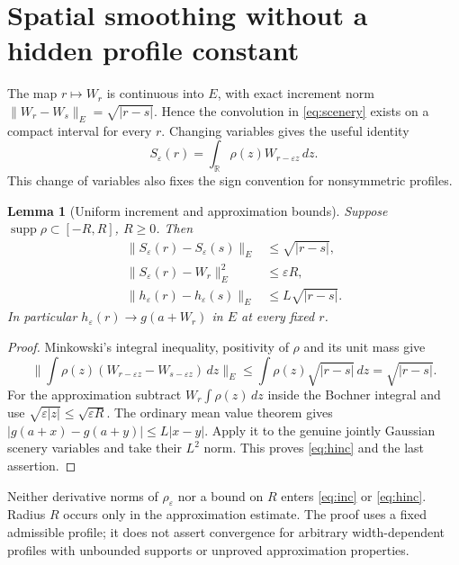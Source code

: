\documentclass[11pt]{article}
\newtheorem{lemma}[theorem]{Lemma}
\newcommand{\R}{\mathbb R}
\begin{document}
\section{Spatial smoothing without a hidden profile constant}
The map $r\mapsto W_r$ is continuous into $E$, with exact increment
norm $\|W_r-W_s\|_E=\sqrt{|r-s|}$. Hence the convolution in
\eqref{eq:scenery} exists on a compact interval for every $r$.
Changing variables gives the useful identity
\[
 S_\varepsilon(r)=\int_\R\rho(z)W_{r-\varepsilon z}\,dz.
\]
This change of variables also fixes the sign convention for nonsymmetric
profiles.

\begin{lemma}[Uniform increment and approximation bounds]\label{lem:spatial}
Suppose $\operatorname{supp}\rho\subset[-R,R]$, $R\geq0$. Then
\begin{align}
 \|S_\varepsilon(r)-S_\varepsilon(s)\|_E
      &\leq\sqrt{|r-s|},\label{eq:inc}\\
 \|S_\varepsilon(r)-W_r\|_E^2&\leq\varepsilon R,\label{eq:error}\\
 \|h_\varepsilon(r)-h_\varepsilon(s)\|_E
      &\leq L\sqrt{|r-s|}.\label{eq:hinc}
\end{align}
In particular $h_\varepsilon(r)\to g(a+W_r)$ in $E$ at every fixed $r$.
\end{lemma}
\begin{proof}
Minkowski's integral inequality, positivity of $\rho$ and its unit mass
give
\[
 \Big\|\int\rho(z)(W_{r-\varepsilon z}-W_{s-\varepsilon z})\,dz\Big\|_E
 \leq\int\rho(z)\sqrt{|r-s|}\,dz=\sqrt{|r-s|}.
\]
For the approximation subtract $W_r\int\rho(z)\,dz$ inside the
Bochner integral and use $\sqrt{\varepsilon|z|}\leq\sqrt{\varepsilon R}$.
The ordinary mean value theorem gives
$|g(a+x)-g(a+y)|\leq L|x-y|$. Apply it to the genuine jointly
Gaussian scenery variables and take their $L^2$ norm. This proves
\eqref{eq:hinc} and the last assertion.
\end{proof}
Neither derivative norms of $\rho_\varepsilon$ nor a bound on $R$
enters \eqref{eq:inc} or \eqref{eq:hinc}. Radius $R$ occurs only in
the approximation estimate. The proof uses a fixed admissible profile;
it does not assert convergence for arbitrary width-dependent profiles
with unbounded supports or unproved approximation properties.
\end{document}
